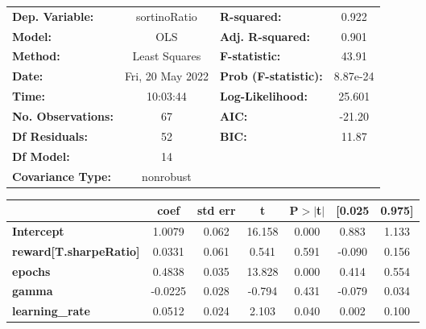 \begin{center}
\begin{tabular}{lclc}
\toprule
\textbf{Dep. Variable:}              &   sortinoRatio   & \textbf{  R-squared:         } &     0.922   \\
\textbf{Model:}                      &       OLS        & \textbf{  Adj. R-squared:    } &     0.901   \\
\textbf{Method:}                     &  Least Squares   & \textbf{  F-statistic:       } &     43.91   \\
\textbf{Date:}                       & Fri, 20 May 2022 & \textbf{  Prob (F-statistic):} &  8.87e-24   \\
\textbf{Time:}                       &     10:03:44     & \textbf{  Log-Likelihood:    } &    25.601   \\
\textbf{No. Observations:}           &          67      & \textbf{  AIC:               } &    -21.20   \\
\textbf{Df Residuals:}               &          52      & \textbf{  BIC:               } &     11.87   \\
\textbf{Df Model:}                   &          14      & \textbf{                     } &             \\
\textbf{Covariance Type:}            &    nonrobust     & \textbf{                     } &             \\
\bottomrule
\end{tabular}
\begin{tabular}{lcccccc}
                                     & \textbf{coef} & \textbf{std err} & \textbf{t} & \textbf{P$> |$t$|$} & \textbf{[0.025} & \textbf{0.975]}  \\
\midrule
\textbf{Intercept}                   &       1.0079  &        0.062     &    16.158  &         0.000        &        0.883    &        1.133     \\
\textbf{reward[T.sharpeRatio]}       &       0.0331  &        0.061     &     0.541  &         0.591        &       -0.090    &        0.156     \\
\textbf{epochs}                      &       0.4838  &        0.035     &    13.828  &         0.000        &        0.414    &        0.554     \\
\textbf{gamma}                       &      -0.0225  &        0.028     &    -0.794  &         0.431        &       -0.079    &        0.034     \\
\textbf{learning\_rate}              &       0.0512  &        0.024     &     2.103  &         0.040        &        0.002    &        0.100     \\

\end{tabular}
\end{center}
